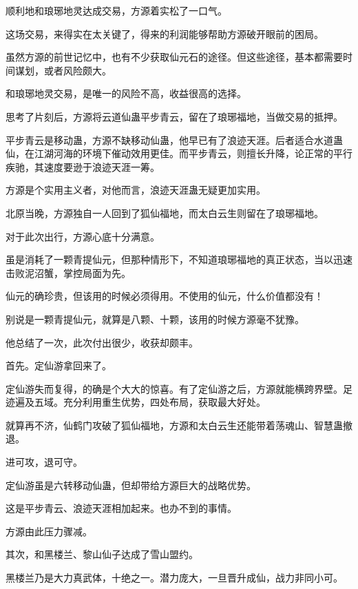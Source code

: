 
\begin{this_body}



顺利地和琅琊地灵达成交易，方源着实松了一口气。

这场交易，来得实在太关键了，得来的利润能够帮助方源破开眼前的困局。

虽然方源的前世记忆中，也有不少获取仙元石的途径。但这些途径，基本都需要时间谋划，或者风险颇大。

和琅琊地灵交易，是唯一的风险不高，收益很高的选择。

思考了片刻后，方源将云道仙蛊平步青云，留在了琅琊福地，当做交易的抵押。

平步青云是移动蛊，方源不缺移动仙蛊，他早已有了浪迹天涯。后者适合水道蛊仙，在江湖河海的环境下催动效用更佳。而平步青云，则擅长升降，论正常的平行疾驰，其速度要逊于浪迹天涯一筹。

方源是个实用主义者，对他而言，浪迹天涯蛊无疑更加实用。

北原当晚，方源独自一人回到了狐仙福地，而太白云生则留在了琅琊福地。

对于此次出行，方源心底十分满意。

虽是消耗了一颗青提仙元，但那种情形下，不知道琅琊福地的真正状态，当以迅速击败泥沼蟹，掌控局面为先。

仙元的确珍贵，但该用的时候必须得用。不使用的仙元，什么价值都没有！

别说是一颗青提仙元，就算是八颗、十颗，该用的时候方源毫不犹豫。

他总结了一次，此次付出很少，收获却颇丰。

首先。定仙游拿回来了。

定仙游失而复得，的确是个大大的惊喜。有了定仙游之后，方源就能横跨界壁。足迹遍及五域。充分利用重生优势，四处布局，获取最大好处。

就算再不济，仙鹤门攻破了狐仙福地，方源和太白云生还能带着荡魂山、智慧蛊撤退。

进可攻，退可守。

定仙游虽是六转移动仙蛊，但却带给方源巨大的战略优势。

这是平步青云、浪迹天涯相加起来。也办不到的事情。

方源由此压力骤减。

其次，和黑楼兰、黎山仙子达成了雪山盟约。

黑楼兰乃是大力真武体，十绝之一。潜力庞大，一旦晋升成仙，战力非同小可。


\end{this_body}
